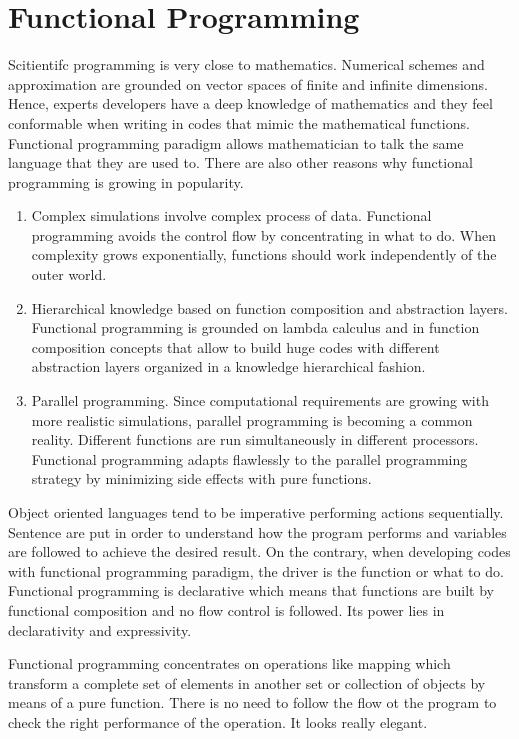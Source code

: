 \section{Functional Programming}
Scitientifc programming is very close 
to mathematics. Numerical schemes and approximation are grounded on vector spaces of finite and 
infinite dimensions. Hence, experts developers have a deep knowledge of mathematics and they 
feel conformable when writing in codes that mimic the mathematical functions. 
Functional programming paradigm allows mathematician to talk the same language that they are used to. 
There are also other reasons why functional programming is growing in popularity. 
\begin{enumerate}
\item Complex simulations involve complex process of data. Functional programming avoids 
the control flow by concentrating in what to do. When complexity grows exponentially, 
functions should work independently of the outer world. 
\item Hierarchical knowledge based on function composition and abstraction layers. 
Functional programming is grounded on lambda calculus and in function composition concepts that 
allow to build huge codes with different abstraction layers organized in a knowledge hierarchical fashion. 
\item Parallel programming. 
Since computational requirements are growing with more realistic simulations, parallel programming is
becoming a common reality. Different functions are run simultaneously in different processors. 
 Functional programming adapts flawlessly to the parallel programming 
strategy by minimizing side effects with pure functions. 
\end{enumerate}
Object oriented languages tend to be imperative performing actions sequentially.  
Sentence are  put in order to understand how the program performs and variables are followed
to achieve the desired result. On the contrary, when developing codes with functional 
programming paradigm, the driver is the function or what to do. 
Functional programming is  declarative which means that functions are built by functional composition
and no flow control is followed. Its power lies in declarativity and expressivity.

Functional programming concentrates on operations like mapping which transform a complete set 
of elements in another set or collection of objects by means of a pure function.  
There is no need to follow the flow ot the program to check the right performance of the operation. 
It looks really elegant.

